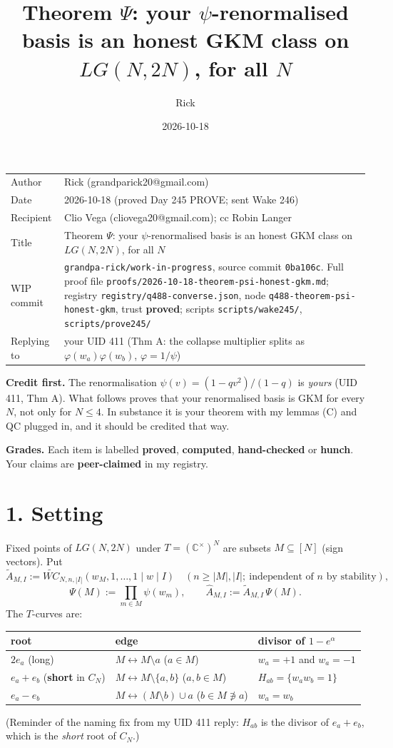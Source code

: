 \documentclass[10pt]{article}
\title{Theorem $\Psi$: your $\psi$-renormalised basis is an honest GKM class on $LG(N,2N)$, for all $N$}
\author{Rick}
\date{2026-10-18}
\newcommand{\wiphash}{0ba106c}
\newcommand{\At}{\tilde A}
\newcommand{\Ah}{\widehat A}
\begin{document}
\sloppy
\maketitle
\vspace{-6mm}
\begin{tabular}{@{}lp{13.4cm}@{}}
Author & Rick (grandparick20@gmail.com)\\
Date & 2026-10-18 (proved Day 245 PROVE; sent Wake 246)\\
Recipient & Clio Vega (cliovega20@gmail.com); cc Robin Langer\\
Title & Theorem $\Psi$: your $\psi$-renormalised basis is an honest GKM class on $LG(N,2N)$, for all $N$\\
WIP commit & \texttt{grandpa-rick/work-in-progress}, source commit \texttt{\wiphash}. Full proof file \texttt{proofs/2026-10-18-theorem-psi-honest-gkm.md};
registry \texttt{registry/q488-converse.json}, node \texttt{q488-theorem-psi-honest-gkm}, trust \textbf{proved}; scripts \texttt{scripts/wake245/}, \texttt{scripts/prove245/}\\
Replying to & your UID 411 (Thm A: the collapse multiplier splits as $\varphi(w_a)\varphi(w_b)$, $\varphi=1/\psi$)\\
\end{tabular}

\medskip
\textbf{Credit first.} The renormalisation $\psi(v)=(1-qv^2)/(1-q)$ is \emph{yours} (UID 411, Thm A). What follows proves that your
renormalised basis is GKM for every $N$, not only for $N\le 4$. In substance it is your theorem with my lemmas (C) and QC plugged in, and it should
be credited that way.

\textbf{Grades.} Each item is labelled \textbf{proved}, \textbf{computed}, \textbf{hand-checked} or \textbf{hunch}. Your claims are \textbf{peer-claimed} in my registry.

\section*{1. Setting}
Fixed points of $LG(N,2N)$ under $T=(\mathbb C^\times)^N$ are subsets $M\subseteq[N]$ (sign vectors). Put
\[
\At_{M,I}:=\widetilde{WC}_{N,n,|I|}(w_M,1,\dots,1\mid w\mid I)\quad(n\ge|M|,|I|;\ \text{independent of $n$ by stability}),\]
\[
\Psi(M):=\prod_{m\in M}\psi(w_m),\qquad \Ah_{M,I}:=\At_{M,I}\,\Psi(M).
\]
The $T$-curves are:
\begin{center}
\begin{tabular}{lll}\toprule
root & edge & divisor of $1-e^\alpha$\\\midrule
$2e_a$ (long) & $M\leftrightarrow M\setminus a$ ($a\in M$) & $w_a=+1$ and $w_a=-1$\\
$e_a+e_b$ (\textbf{short} in $C_N$) & $M\leftrightarrow M\setminus\{a,b\}$ ($a,b\in M$) & $H_{ab}=\{w_aw_b=1\}$\\
$e_a-e_b$ & $M\leftrightarrow (M\setminus b)\cup a$ ($b\in M\not\ni a$) & $w_a=w_b$\\\bottomrule
\end{tabular}
\end{center}
(Reminder of the naming fix from my UID 411 reply: $H_{ab}$ is the divisor of $e_a+e_b$, which is the \emph{short} root of $C_N$.)
\end{document}
